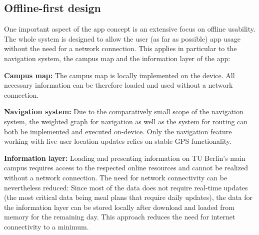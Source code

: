 \subsection{Offline-first design}
One important aspect of the app concept is an extensive focus on offline usability. The whole system is designed to allow the user (as far as possible) app usage without the need for a network connection. This applies in particular to the navigation system, the campus map and the information layer of the app:

\textbf{Campus map:} The campus map is locally implemented on the device. All necessary information can be therefore loaded and used without a network connection.

\textbf{Navigation system:} Due to the comparatively small scope of the navigation system, the weighted graph for navigation as well as the system for routing can both be implemented and executed on-device. Only the navigation feature working with live user location updates relies on stable GPS functionality.

\textbf{Information layer:} Loading and presenting information on TU Berlin's main campus requires access to the respected online resources and cannot be realized without a network connection. The need for network connectivity can be nevertheless reduced: Since most of the data does not require real-time updates (the most critical data being meal plans that require daily updates), the data for the information layer can be stored locally after download and loaded from memory for the remaining day. This approach reduces the need for internet connectivity to a minimum.


